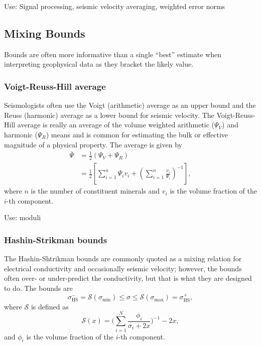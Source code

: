 Use: Signal processing, seismic velocity averaging, weighted error norms


\subsection{Mixing Bounds}
Bounds are often more informative than a single “best” estimate when interpreting geophysical data as they bracket the likely value.

\subsubsection{Voigt-Reuss-Hill average}
Seismologists often use the Voigt (arithmetic) average as an upper bound and the Reuss (harmonic) average as a lower bound for seismic velocity.  The Voigt-Reuss-Hill average is really an average of the volume weighted arithmetic ($\Psi_V$) and harmonic ($\Psi_R$) means and is common for estimating the bulk or effective magnitude of a physical property.  The average is given by
\begin{align}
    \bar{\Psi} &= \frac{1}{2}(\Psi_V + \Psi_R) \\
    &= \frac{1}{2}\left[
    \sum_{i = 1}^n \Psi_i v_i +
    \left( \sum_{i = 1}^n \frac{v_i}{\Psi_i} \right)^{-1}
    \right],
\end{align}
where $n$ is the number of constituent minerals and $v_i$ is the volume fraction
of the $i$-th component.

Use: moduli

\subsubsection{Hashin-Strikman bounds}
The Hashin-Shtrikman bounds are commonly quoted as a mixing relation for
electrical conductivity and occasionally seismic velocity; however, the bounds
often over- or under-predict the conductivity, but that is what they are
designed to do.  The bounds are
\begin{equation}
    \sigma_{\mathrm{HS}}^- = \mathcal{S}(\sigma_{\mathrm{min}}) \leq \sigma \leq
    \mathcal{S}(\sigma_{\mathrm{max}}) = \sigma_{\mathrm{HS}}^+,
\end{equation}
where $\mathcal{S}$ is defined as
\begin{equation}
    \mathcal{S}(x) =
    \Biggl( \sum_{i=1}^N \frac{\phi_i}{\sigma_i + 2x} \Biggr)^{-1} - 2x ,
\end{equation}
and $\phi_i$ is the volume fraction of the $i$-th component.

